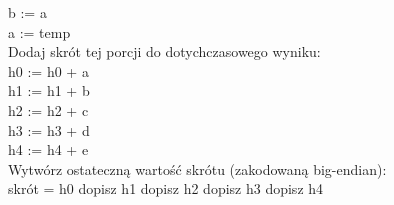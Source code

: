 \documentclass[oneside]{mgr}
\begin{document}
\hspace*{20mm}b := a\\
\hspace*{20mm}a := temp\\
\hspace*{10mm}Dodaj skrót tej porcji do dotychczasowego wyniku:\\
\hspace*{20mm}h0 := h0 + a\\
\hspace*{20mm}h1 := h1 + b\\
\hspace*{20mm}h2 := h2 + c\\
\hspace*{20mm}h3 := h3 + d\\
\hspace*{20mm}h4 := h4 + e\\
Wytwórz ostateczną wartość skrótu (zakodowaną big-endian):\\
\hspace*{10mm}skrót = h0 dopisz h1 dopisz h2 dopisz h3 dopisz h4
\end{document}
